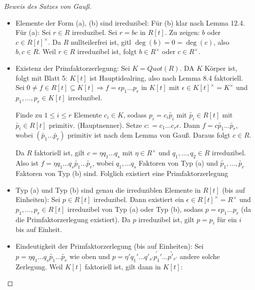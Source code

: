 \documentclass[12pt,a4paper]{scrartcl}
\begin{document}
\begin{proof}[Beweis des Satzes von Gauß] %
	\leavevmode
	\begin{itemize}
		\item Elemente der Form (a), (b) sind irreduzibel: Für (b) klar nach Lemma 12.4. Für (a): Sei $r\in R$ irreduzibel. Sei $r = bc$ in $R[t]$. Zu zeigen: $b$ oder $c\in R[t]^{\times}$. Da $R$ nullteilerfrei ist, gitl $\deg (b) = 0  =\deg (c)$, also $b,c\in R$. Weil $r\in R$ irreduzibel ist, folgt $b\in R^{\times}$ oder $c\in R^{\times}$.
		
		\item Existenz der Primfaktorzerlegung: Sei $K = Quot(R)$. DA $K$ Körper ist, folgt mit Blatt 5: $K[t]$ ist Hauptidealring, also nach Lemma 8.4 faktoriell. Sei $0\neq f\in R[t]\subseteq K[t]\Rightarrow f = \epsilon p_1\dots p_r$ in $K[t]$ mit $\epsilon\in K[t]^{\times} = K^{\times}$ und $p_1,\dots,p_r\in K[t]$ irreduzibel.
		
		Finde zu $1\leq i\leq r$ Elemente $c_i\in K$, sodass $p_i = c_i\tilde{p_i}$ mit $\tilde{p_i}\in R[t]$ mit $\tilde{p_i}\in R[t] $ primitiv.  (\glqq Hauptnenner\grqq). Setze $c: = c_1\dots c_r\epsilon$. Dann $f = c\tilde{p_1}\dots \tilde{p_r}$, wobei $(\tilde{p_1}\dots\tilde{p_r})$ primitiv ist nach dem Lemma von Gauß. Daraus folgt $c\in R$.
		
		Da $R$ faktoriell ist, gilt $c = \eta q_1\dots q_s$ mit $\eta\in R^{\times}$ und $q_1,\dots,q_2\in R$ irreduzibel. Also ist $f = \eta q_1\dots q_s\tilde{p_1}\dots \tilde{p_r}$, wobei $q_1,\dots q_s$ Faktoren von Typ (a) und $\tilde{p_1},\dots, \tilde{p_r}$ Faktoren von Typ (b) sind. Folglich existiert eine Primfaktorzerlegung
		
		\item Typ (a) und Typ (b) sind genau die irreduziblen Elemente in $R[t]$ (bis auf Einheiten): Sei $p\in R[t]$ irreduzibel. Dann existiert ein $\epsilon \in R[t]^{\times} = R^{\times}$ und $p_1,\dots,p_r\in R[t]$ irreduzibel von Typ (a) oder Typ (b), sodass $p = \epsilon p_1\dots p_r$ (da die Primfaktorzerlegung existiert). Da $p$ irreduzibel ist, gilt $p = p_i$ für ein $i$ bis auf Einheit.
		
		\item Eindeutigkeit der Primfaktorzerlegung (bis auf Einheiten): Sei $p = \eta q_1\dots q_s\tilde {p_1}\dots \tilde{p_r}$ wie oben und $p = \eta'q_1'\dots q'_{s'}\tilde{p_1'}\dots\tilde{p'_{r'}}$ andere solche Zerlegung.
		Weil $K[t]$ faktoriell ist, gilt dann in $K[t]$:
		

\end{itemize}
\end{proof}
\end{document}
